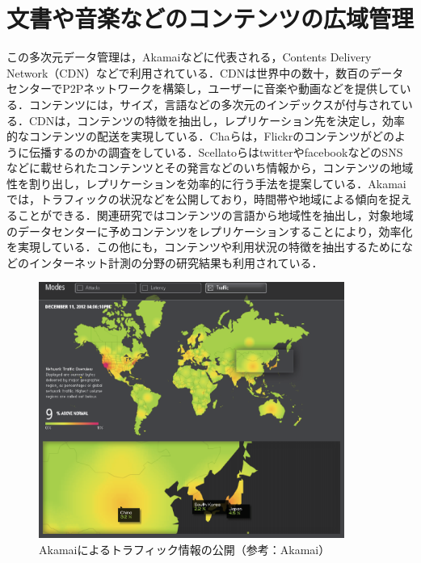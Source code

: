 \section{文書や音楽などのコンテンツの広域管理}
この多次元データ管理は，Akamai\cite{Akamai}などに代表される，Contents Delivery Network（CDN）などで利用されている．CDNは世界中の数十，数百のデータセンターでP2Pネットワークを構築し，ユーザーに音楽や動画などを提供している．コンテンツには，サイズ，言語などの多次元のインデックスが付与されている．CDNは，コンテンツの特徴を抽出し，レプリケーション先を決定し，効率的なコンテンツの配送を実現している．Chaら\cite{Cha:2009:MAI:1526709.1526806}は，Flickr\cite{Flickr}のコンテンツがどのように伝播するのかの調査をしている．Scellatoら\cite{Scellato:2011:TGD:1963405.1963471}はtwitter\cite{twitter}やfacebook\cite{Facebook}などのSNSなどに載せられたコンテンツとその発言などのいち情報から，コンテンツの地域性を割り出し，レプリケーションを効率的に行う手法を提案している．Akamaiでは，トラフィックの状況などを公開しており，時間帯や地域による傾向を捉えることができる．関連研究ではコンテンツの言語から地域性を抽出し，対象地域のデータセンターに予めコンテンツをレプリケーションすることにより，効率化を実現している．この他にも，コンテンツや利用状況の特徴を抽出するために\cite{Tang:2012:MAA:2310257.2310450}\cite{Labovitz:2010:IIT:1851182.1851194}\cite{Maier:2009:DCR:1644893.1644904}\cite{Otto:2011:BME:2018436.2018450}などのインターネット計測の分野の研究結果も利用されている．

\begin{figure}[htbp]
 \begin{center}
  \includegraphics[width=100mm]{./images/akamai.eps}
 \end{center}
 \caption{Akamaiによるトラフィック情報の公開（参考：Akamai\cite{Akamai}）}
 \label{fig:akamai}
\end{figure}

